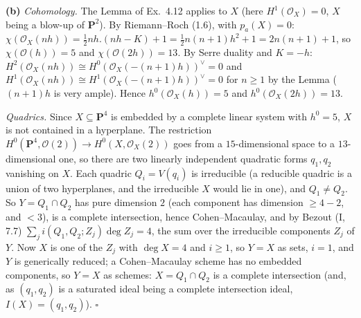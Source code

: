 \documentclass[11pt]{article}
\begin{document}
\textbf{(b)} \emph{Cohomology.} The Lemma of Ex.~4.12 applies to $X$ (here $H^1(\mathcal O_X)=0$, $X$ being a blow-up of $\mathbf P^2$). By Riemann--Roch (1.6), with $p_a(X)=0$: $\chi(\mathcal O_X(nh))=\frac12nh.(nh-K)+1=\frac12n(n+1)h^2+1=2n(n+1)+1$, so $\chi(\mathcal O(h))=5$ and $\chi(\mathcal O(2h))=13$. By Serre duality and $K=-h$: $H^2(\mathcal O_X(nh))\cong H^0(\mathcal O_X(-(n+1)h))^\vee=0$ and $H^1(\mathcal O_X(nh))\cong H^1(\mathcal O_X(-(n+1)h))^\vee=0$ for $n\ge1$ by the Lemma ($(n+1)h$ is very ample). Hence $h^0(\mathcal O_X(h))=5$ and $h^0(\mathcal O_X(2h))=13$.

\emph{Quadrics.} Since $X\subseteq\mathbf P^4$ is embedded by a complete linear system with $h^0=5$, $X$ is not contained in a hyperplane. The restriction $H^0(\mathbf P^4,\mathcal O(2))\to H^0(X,\mathcal O_X(2))$ goes from a $15$-dimensional space to a $13$-dimensional one, so there are two linearly independent quadratic forms $q_1,q_2$ vanishing on $X$. Each quadric $Q_i=V(q_i)$ is irreducible (a reducible quadric is a union of two hyperplanes, and the irreducible $X$ would lie in one), and $Q_1\ne Q_2$. So $Y=Q_1\cap Q_2$ has pure dimension $2$ (each component has dimension $\ge4-2$, and $<3$), is a complete intersection, hence Cohen--Macaulay, and by Bezout (I, 7.7) $\sum_ji(Q_1,Q_2;Z_j)\deg Z_j=4$, the sum over the irreducible components $Z_j$ of $Y$. Now $X$ is one of the $Z_j$ with $\deg X=4$ and $i\ge1$, so $Y=X$ as sets, $i=1$, and $Y$ is generically reduced; a Cohen--Macaulay scheme has no embedded components, so $Y=X$ as schemes: $X=Q_1\cap Q_2$ is a complete intersection (and, as $(q_1,q_2)$ is a saturated ideal being a complete intersection ideal, $I(X)=(q_1,q_2)$). \hfill$\square$
\end{document}
